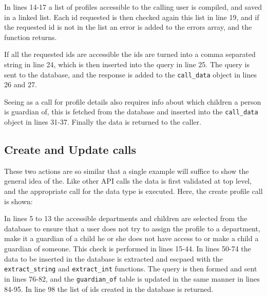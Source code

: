 

In lines 14-17 a list of profiles accessible to the calling user is compiled, and saved in a linked list. Each id requested is then checked again this list in line 19, and if the requested id is not in the list an error is added to the errors array, and the function returns.

If all the requested ids are accessible the ids are turned into a comma separated string in line 24, which is then inserted into the query in line 25. The query is sent to the database, and the response is added to the \lstinline|call_data| object in lines 26 and 27.

Seeing as a call for profile details also requires info about which children a person is guardian of, this is fetched from the database and inserted into the \lstinline|call_data| object in lines 31-37. Finally the data is returned to the caller.

\subsection{Create and Update calls}
These two actions are so similar that a single example will suffice to show the general idea of the. Like other API calls the data is first validated at top level, and the appropriate call for the data type is executed. Here, the create profile call is shown:



In lines 5 to 13 the accessible departments and children are selected from the database to ensure that a user does not try to assign the profile to a department, make it a guardian of a child he or she does not have access to or make a child a guardian of someone. This check is performed in lines 15-44. In lines 50-74 the data to be inserted in the database is extracted and escpaed with the \lstinline|extract_string| and \lstinline|extract_int| functions. The query is then formed and sent in lines 76-82, and the \lstinline|guardian_of| table is updated in the same manner in lines 84-95. In line 98 the list of ids created in the database is returned.